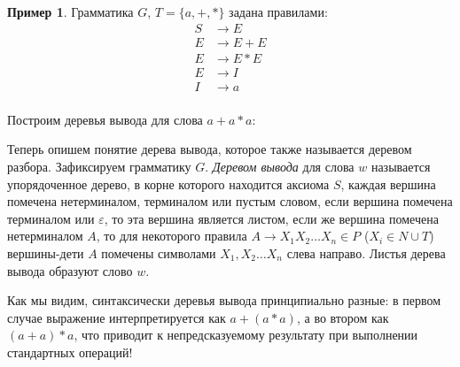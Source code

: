 \documentclass[12pt]{article}
\theoremstyle{definiton}
\theoremstyle{definition}
\newtheorem{Example}{Пример}
\theoremstyle{definition}
\let\eps\varepsilon
\begin{document}
\begin{Example}\label{GTree}
	Грамматика $G$, $T = \{a, +, *\}$ задана правилами:
	\begin{align*}
		S &\to E\\
		E &\to E+E\\
		E &\to E*E\\
		E &\to I\\
		I &\to a\\
	\end{align*}

	Построим деревья вывода для слова $a + a * a$:

	
	\begin{multicols}{2}
		\begin{flushleft}
			
				\end{flushleft}
		\begin{flushright}
			
				\end{flushright}	
	\end{multicols}
	
   Теперь опишем понятие дерева вывода, которое также называется деревом разбора. Зафиксируем грамматику $G$. \emph{Деревом вывода} для слова $w$  называется упорядоченное дерево, в корне которого находится аксиома $S$, каждая вершина помечена нетерминалом, терминалом или пустым словом, если вершина помечена терминалом или $\eps$, то эта вершина является листом, если же вершина помечена нетерминалом $A$, то для некоторого правила $ A \to X_1X_2\ldots X_n \in P$ ($X_i \in N\cup T$) вершины-дети $A$ помечены символами $X_1, X_2\ldots X_n$ слева направо. Листья дерева вывода образуют слово $w$.
	
	Как мы видим, синтаксически деревья вывода принципиально разные: в первом случае выражение интерпретируется как  $a + (a*a)$, а во втором как $(a+a)*a$, что приводит к непредсказуемому результату при выполнении стандартных операций!
	
\end{Example}
\end{document}
